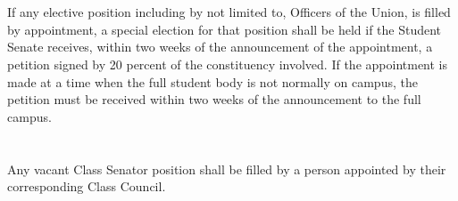 \section{}
If any elective position including by not limited to, Officers of the Union, is filled by appointment, a
special election for that position shall be held if the Student Senate receives, within two weeks of the
announcement of the appointment, a petition signed by 20 percent of the constituency involved. If the
appointment is made at a time when the full student body is not normally on campus, the petition must
be received within two weeks of the announcement to the full campus.

\section{}
Any vacant Class Senator position shall be filled by a person appointed by their corresponding Class
Council.